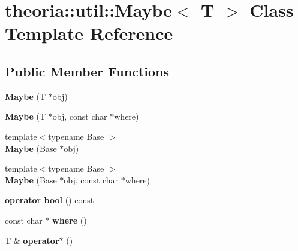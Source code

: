 \hypertarget{classtheoria_1_1util_1_1Maybe}{\section{theoria\+:\+:util\+:\+:Maybe$<$ T $>$ Class Template Reference}
\label{classtheoria_1_1util_1_1Maybe}
}
\subsection*{Public Member Functions}
\begin{DoxyCompactItemize}
\item 
\hypertarget{classtheoria_1_1util_1_1Maybe_aff51836d12cb53b458316be21391e847}{{\bfseries Maybe} (T $\ast$obj)}\label{classtheoria_1_1util_1_1Maybe_aff51836d12cb53b458316be21391e847}

\item 
\hypertarget{classtheoria_1_1util_1_1Maybe_a20f1e97e3620fed19c579ffdc9063bf8}{{\bfseries Maybe} (T $\ast$obj, const char $\ast$where)}\label{classtheoria_1_1util_1_1Maybe_a20f1e97e3620fed19c579ffdc9063bf8}

\item 
\hypertarget{classtheoria_1_1util_1_1Maybe_a077b3ce153debaf6adb797ebf494745b}{{\footnotesize template$<$typename Base $>$ }\\{\bfseries Maybe} (Base $\ast$obj)}\label{classtheoria_1_1util_1_1Maybe_a077b3ce153debaf6adb797ebf494745b}

\item 
\hypertarget{classtheoria_1_1util_1_1Maybe_a955e6b90184ad9e054038ebbd8dab3c6}{{\footnotesize template$<$typename Base $>$ }\\{\bfseries Maybe} (Base $\ast$obj, const char $\ast$where)}\label{classtheoria_1_1util_1_1Maybe_a955e6b90184ad9e054038ebbd8dab3c6}

\item 
\hypertarget{classtheoria_1_1util_1_1Maybe_a07c4193ee941a701f3490ab271aa4244}{{\bfseries operator bool} () const }\label{classtheoria_1_1util_1_1Maybe_a07c4193ee941a701f3490ab271aa4244}

\item 
\hypertarget{classtheoria_1_1util_1_1Maybe_a2dbc83104aa3cac55f043e468ef3e86f}{const char $\ast$ {\bfseries where} ()}\label{classtheoria_1_1util_1_1Maybe_a2dbc83104aa3cac55f043e468ef3e86f}

\item 
\hypertarget{classtheoria_1_1util_1_1Maybe_abe504b965167614138072fe5d227f3f6}{T \& {\bfseries operator$\ast$} ()}\label{classtheoria_1_1util_1_1Maybe_abe504b965167614138072fe5d227f3f6}


\end{DoxyCompactItemize}
